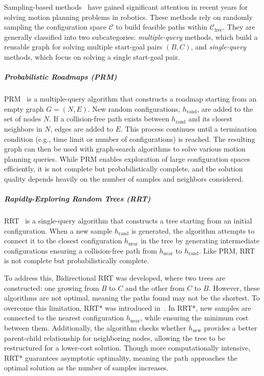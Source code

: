 Sampling-based methods~\cite{lavalle2006planning} have gained significant attention in recent years for solving motion planning problems in robotics. These methods rely on randomly sampling the configuration space $\mathcal{C}$ to build feasible paths within $\mathcal{C}_{\text{free}}$. They are generally classified into two subcategories: \textit{multiple-query} methods, which build a reusable graph for solving multiple start-goal pairs $(B, C)$, and \textit{single-query} methods, which focus on solving a single start-goal pair.

\subparagraph{Probabilistic Roadmaps (PRM)} 

PRM~\cite{kavraki1996probabilistic} is a multiple-query algorithm that constructs a roadmap starting from an empty graph $G = (N, E)$. New random configurations, $h_{\text{rand}}$, are added to the set of nodes $N$. If a collision-free path exists between $h_{\text{rand}}$ and its closest neighbors in $N$, edges are added to $E$. This process continues until a termination condition (e.g., time limit or number of configurations) is reached. The resulting graph can then be used with graph-search algorithms to solve various motion planning queries. While PRM enables exploration of large configuration spaces efficiently, it is not complete but probabilistically complete, and the solution quality depends heavily on the number of samples and neighbors considered.

\subparagraph{Rapidly-Exploring Random Trees (RRT)} 

RRT~\cite{lavalle2006planning} is a single-query algorithm that constructs a tree starting from an initial configuration. When a new sample $h_{\text{rand}}$ is generated, the algorithm attempts to connect it to the closest configuration $h_{\text{near}}$ in the tree by generating intermediate configurations ensuring a collision-free path from $h_{\text{near}}$ to $h_{\text{rand}}$. Like PRM, RRT is not complete but probabilistically complete. 

To address this, Bidirectional RRT was developed, where two trees are constructed: one growing from $B$ to $C$ and the other from $C$ to $B$. However, these algorithms are not optimal, meaning the paths found may not be the shortest. To overcome this limitation, RRT* was introduced in~\cite{karaman2011sampling}. In RRT*, new samples are connected to the nearest configuration $h_{\text{near}}$, while ensuring the minimum cost between them. Additionally, the algorithm checks whether $h_{\text{new}}$ provides a better parent-child relationship for neighboring nodes, allowing the tree to be restructured for a lower-cost solution. Though more computationally intensive, RRT* guarantees asymptotic optimality, meaning the path approaches the optimal solution as the number of samples increases.

